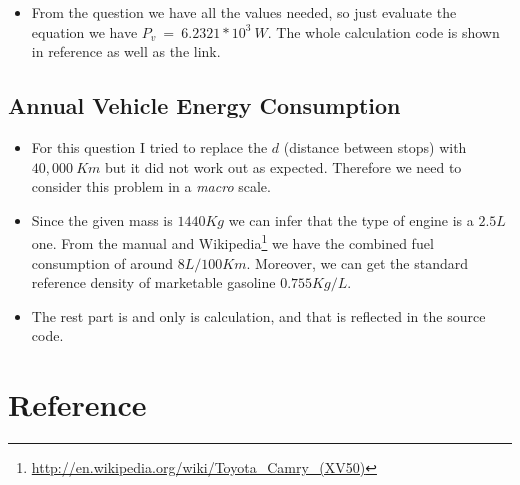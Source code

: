 \documentclass[12pt]{article}
\begin{document}
\begin{itemize}
\item From the question we have all the values needed, so just
  evaluate the equation we have $P_{v}~=~6.2321*10^{3}~W$. The whole
  calculation code is shown in reference as well as the link.
\end{itemize}

\subsection{Annual Vehicle Energy Consumption}
\label{sec:annu-vehicle-energy}
\begin{itemize}
\item For this question I tried to replace the $d$ (distance between
  stops) with $40,000~Km$ but it did not work out as
  expected. Therefore we need to consider this problem in a
  \emph{macro} scale.
\item Since the given mass is $1440Kg$ we can infer that the type of
  engine is a $2.5L$ one. From the manual and
  Wikipedia\footnote{\url{http://en.wikipedia.org/wiki/Toyota_Camry_(XV50)}}
  we have the combined fuel consumption of around
  $8L/100Km$. Moreover, we can get the standard reference density of
  marketable gasoline $0.755Kg/L$. 
\item The rest part is and only is calculation, and that is reflected
  in the source code.
\end{itemize}


\section{Reference}
\label{sec:reference}
\end{document}
